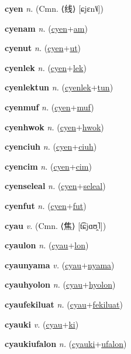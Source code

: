 \textbf{\hypertarget{cyen}{cyen}} \textit{n.} (Cmn. ⟨{\chinese{}线}⟩ [ɕjɛn˥˩])


\textbf{\hypertarget{cyenam}{cyenam}} \textit{n.} (\hyperlink{cyen}{cyen}+\allowbreak \hyperlink{am}{am})


\textbf{\hypertarget{cyenut}{cyenut}} \textit{n.} (\hyperlink{cyen}{cyen}+\allowbreak \hyperlink{ut}{ut})


\textbf{\hypertarget{cyenlek}{cyenlek}} \textit{n.} (\hyperlink{cyen}{cyen}+\allowbreak \hyperlink{lek}{lek})


\textbf{\hypertarget{cyenlektun}{cyenlektun}} \textit{n.} (\hyperlink{cyenlek}{cyenlek}+\allowbreak \hyperlink{tun}{tun})


\textbf{\hypertarget{cyenmuf}{cyenmuf}} \textit{n.} (\hyperlink{cyen}{cyen}+\allowbreak \hyperlink{muf}{muf})


\textbf{\hypertarget{cyenhwok}{cyenhwok}} \textit{n.} (\hyperlink{cyen}{cyen}+\allowbreak \hyperlink{hwok}{hwok})


\textbf{\hypertarget{cyenciuh}{cyenciuh}} \textit{n.} (\hyperlink{cyen}{cyen}+\allowbreak \hyperlink{ciuh}{ciuh})


\textbf{\hypertarget{cyencim}{cyencim}} \textit{n.} (\hyperlink{cyen}{cyen}+\allowbreak \hyperlink{cim}{cim})


\textbf{\hypertarget{cyenseleal}{cyenseleal}} \textit{n.} (\hyperlink{cyen}{cyen}+\allowbreak \hyperlink{seleal}{seleal})


\textbf{\hypertarget{cyenfut}{cyenfut}} \textit{n.} (\hyperlink{cyen}{cyen}+\allowbreak \hyperlink{fut}{fut})


\textbf{\hypertarget{cyau}{cyau}} \textit{v.} (Cmn. ⟨{\chinese{}焦}⟩ [t͡ɕjɑʊ̯˥])


\textbf{\hypertarget{cyaulon}{cyaulon}} \textit{n.} (\hyperlink{cyau}{cyau}+\allowbreak \hyperlink{lon}{lon})


\textbf{\hypertarget{cyaunyama}{cyaunyama}} \textit{v.} (\hyperlink{cyau}{cyau}+\allowbreak \hyperlink{nyama}{nyama})


\textbf{\hypertarget{cyauhyolon}{cyauhyolon}} \textit{n.} (\hyperlink{cyau}{cyau}+\allowbreak \hyperlink{hyolon}{hyolon})


\textbf{\hypertarget{cyaufekiluat}{cyaufekiluat}} \textit{n.} (\hyperlink{cyau}{cyau}+\allowbreak \hyperlink{fekiluat}{fekiluat})


\textbf{\hypertarget{cyauki}{cyauki}} \textit{v.} (\hyperlink{cyau}{cyau}+\allowbreak \hyperlink{ki}{ki})


\textbf{\hypertarget{cyaukiufalon}{cyaukiufalon}} \textit{n.} (\hyperlink{cyauki}{cyauki}+\allowbreak \hyperlink{ufalon}{ufalon})


